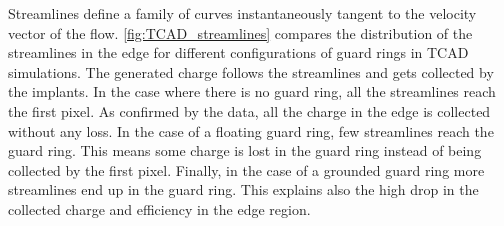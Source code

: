 Streamlines define a family of curves instantaneously tangent to the
velocity vector of the flow. \cref{fig:TCAD_streamlines} compares the
distribution of the streamlines in the edge for different
configurations of guard rings in TCAD simulations. The generated
charge follows the streamlines and gets collected by the implants. In
the case where there is no guard ring, all the streamlines reach the
first pixel. As confirmed by the data, all the charge in the edge is
collected without any loss. In the case of a floating guard ring, few
streamlines reach the guard ring. This means some charge is lost in
the guard ring instead of being collected by the first pixel. Finally,
in the case of a grounded guard ring more streamlines end up in the
guard ring. This explains also the high drop in the collected charge
and efficiency in the edge region.

